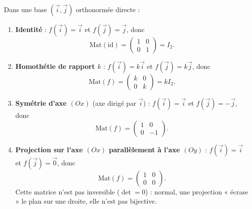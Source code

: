 \documentclass[11pt]{article}
\begin{document}
\begin{exemplebox}
Dans une base $(\vec{i}, \vec{j})$ orthonormée directe :
\begin{enumerate}
\item \textbf{Identité} : $f(\vec{i}) = \vec{i}$ et $f(\vec{j}) = \vec{j}$, donc
\[ \mathrm{Mat}(\mathrm{id}) = \begin{pmatrix} 1 & 0 \\ 0 & 1 \end{pmatrix} = I_2. \]
\item \textbf{Homothétie de rapport $k$} : $f(\vec{i}) = k\vec{i}$ et $f(\vec{j}) = k\vec{j}$, donc
\[ \mathrm{Mat}(f) = \begin{pmatrix} k & 0 \\ 0 & k \end{pmatrix} = k I_2. \]
\item \textbf{Symétrie d'axe $(Ox)$} (axe dirigé par $\vec{i}$) : $f(\vec{i}) = \vec{i}$ et $f(\vec{j}) = -\vec{j}$, donc
\[ \mathrm{Mat}(f) = \begin{pmatrix} 1 & 0 \\ 0 & -1 \end{pmatrix}. \]
\item \textbf{Projection sur l'axe $(Ox)$ parallèlement à l'axe $(Oy)$} : $f(\vec{i}) = \vec{i}$ et $f(\vec{j}) = \vec{0}$, donc
\[ \mathrm{Mat}(f) = \begin{pmatrix} 1 & 0 \\ 0 & 0 \end{pmatrix}. \]
Cette matrice n'est pas inversible ($\det = 0$) : normal, une projection « écrase » le plan sur une droite, elle n'est pas bijective.
\end{enumerate}
\end{exemplebox}
\end{document}
